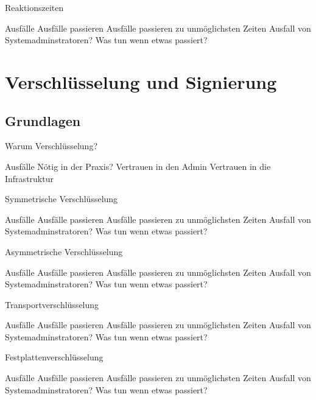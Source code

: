 \documentclass[10pt]{beamer}
\begin{document}
\begin{frame}[fragile]{Reaktionszeiten}
\begin{alertblock}{Ausfälle}
	Ausfälle passieren
	Ausfälle passieren zu unmöglichsten Zeiten
	Ausfall von Systemadminstratoren?
	Was tun wenn etwas passiert?
\end{alertblock}
\end{frame}

\section{Verschlüsselung und Signierung}

\subsection{Grundlagen}

\begin{frame}[fragile]{Warum Verschlüsselung?}
\begin{alertblock}{Ausfälle}
Nötig in der Praxis?
Vertrauen in den Admin
Vertrauen in die Infrastruktur
\end{alertblock}
\end{frame}

\begin{frame}[fragile]{Symmetrische Verschlüsselung}
\begin{alertblock}{Ausfälle}
	Ausfälle passieren
	Ausfälle passieren zu unmöglichsten Zeiten
	Ausfall von Systemadminstratoren?
	Was tun wenn etwas passiert?
\end{alertblock}
\end{frame}

\begin{frame}[fragile]{Asymmetrische Verschlüsselung}
\begin{alertblock}{Ausfälle}
	Ausfälle passieren
	Ausfälle passieren zu unmöglichsten Zeiten
	Ausfall von Systemadminstratoren?
	Was tun wenn etwas passiert?
\end{alertblock}
\end{frame}

\begin{frame}[fragile]{Transportverschlüsselung}
\begin{alertblock}{Ausfälle}
	Ausfälle passieren
	Ausfälle passieren zu unmöglichsten Zeiten
	Ausfall von Systemadminstratoren?
	Was tun wenn etwas passiert?
\end{alertblock}
\end{frame}

\begin{frame}[fragile]{Festplattenverschlüsselung}
\begin{alertblock}{Ausfälle}
	Ausfälle passieren
	Ausfälle passieren zu unmöglichsten Zeiten
	Ausfall von Systemadminstratoren?
	Was tun wenn etwas passiert?
\end{alertblock}
\end{frame}
\end{document}
